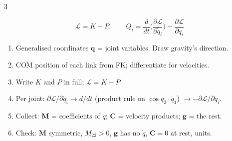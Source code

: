\begin{multicols}{3}
\begin{fbx}
\[\mathcal L=K-P,\qquad Q_i=\frac{d}{dt}\Big(\frac{\partial\mathcal L}{\partial\dot q_i}\Big)-\frac{\partial\mathcal L}{\partial q_i}\]
\end{fbx}
\begin{recipe}
\label{w7:lag}
\begin{enumerate}
\item Generalised coordinates $\mathbf q$ = joint variables. Draw gravity's direction.
\item COM position of each link from FK; differentiate for velocities.
\item Write $K$ and $P$ in full; $\mathcal L=K-P$.
\item Per joint: $\partial\mathcal L/\partial\dot q_i\to d/dt$ (product rule on $\cos q_2\cdot\dot q_1$) $\to-\partial\mathcal L/\partial q_i$.
\item Collect: $\mathbf M$ = coefficients of $\ddot q$; $\mathbf C$ = velocity products; $\mathbf g$ = the rest.
\item Check: $\mathbf M$ symmetric, $M_{22}>0$, $\mathbf g$ has no $\dot q$, $\mathbf C=0$ at rest, units.
\end{enumerate}
\end{recipe}


\end{multicols}
